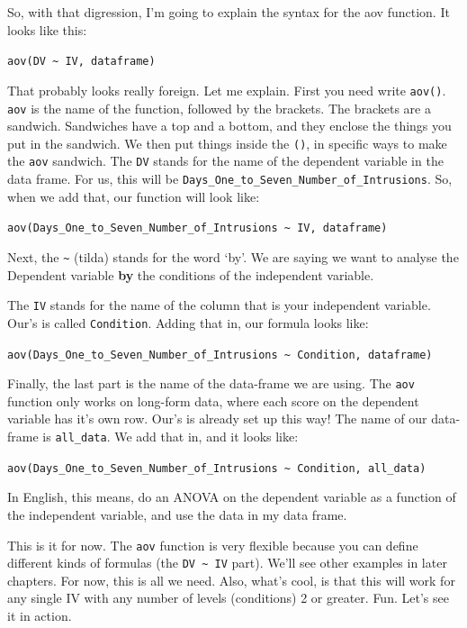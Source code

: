 \documentclass[
]{book}
\begin{document}
So, with that digression, I'm going to explain the syntax for the aov function. It looks like this:

\texttt{aov(DV\ \textasciitilde{}\ IV,\ dataframe)}

That probably looks really foreign. Let me explain. First you need write \texttt{aov()}. \texttt{aov} is the name of the function, followed by the brackets. The brackets are a sandwich. Sandwiches have a top and a bottom, and they enclose the things you put in the sandwich. We then put things inside the \texttt{()}, in specific ways to make the \texttt{aov} sandwich. The \texttt{DV} stands for the name of the dependent variable in the data frame. For us, this will be \texttt{Days\_One\_to\_Seven\_Number\_of\_Intrusions}. So, when we add that, our function will look like:

\texttt{aov(Days\_One\_to\_Seven\_Number\_of\_Intrusions\ \textasciitilde{}\ IV,\ dataframe)}

Next, the \texttt{\textasciitilde{}} (tilda) stands for the word `by'. We are saying we want to analyse the Dependent variable \textbf{by} the conditions of the independent variable.

The \texttt{IV} stands for the name of the column that is your independent variable. Our's is called \texttt{Condition}. Adding that in, our formula looks like:

\texttt{aov(Days\_One\_to\_Seven\_Number\_of\_Intrusions\ \textasciitilde{}\ Condition,\ dataframe)}

Finally, the last part is the name of the data-frame we are using. The \texttt{aov} function only works on long-form data, where each score on the dependent variable has it's own row. Our's is already set up this way! The name of our data-frame is \texttt{all\_data}. We add that in, and it looks like:

\texttt{aov(Days\_One\_to\_Seven\_Number\_of\_Intrusions\ \textasciitilde{}\ Condition,\ all\_data)}

In English, this means, do an ANOVA on the dependent variable as a function of the independent variable, and use the data in my data frame.

This is it for now. The \texttt{aov} function is very flexible because you can define different kinds of formulas (the \texttt{DV\ \textasciitilde{}\ IV} part). We'll see other examples in later chapters. For now, this is all we need. Also, what's cool, is that this will work for any single IV with any number of levels (conditions) 2 or greater. Fun. Let's see it in action.
\end{document}
